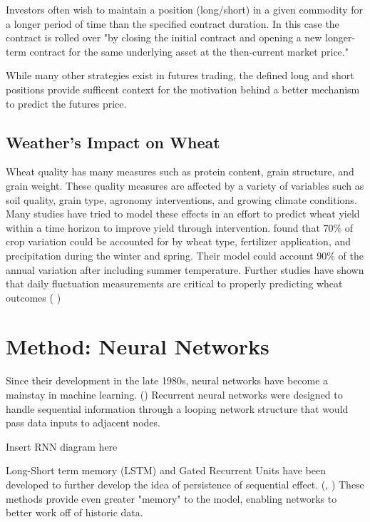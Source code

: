 \documentclass[twoside,11pt]{article}
\begin{document}
  Investors often wish to maintain a position (long/short) in a given commodity for a longer period of time than the specified contract duration. In this case the contract is rolled over "by closing the initial contract and opening a new longer-term contract for the same underlying asset at the then-current market price." \cite{InvestopediaRF}

  While many other strategies exist in futures trading, the defined long and short positions provide sufficent context for the motivation behind a better mechanism to predict the futures price.
 
\subsection{Weather's Impact on Wheat}
	
	Wheat quality has many measures such as protein content, grain structure, and grain weight. These quality measures are affected by a variety of variables such as soil quality, grain type, agronomy interventions, and growing climate conditions. Many studies have tried to model these effects in an effort to predict wheat yield within a time horizon to improve yield through intervention. \cite{Gooding2017} found that 70\% of crop variation could be accounted for by wheat type, fertilizer application, and precipitation during the winter and spring. Their model could account 90\% of the annual variation after including summer temperature. Further studies have shown that daily fluctuation measurements are critical to properly predicting wheat outcomes (\cite{Nuttall2017} \cite{Mearns1996})
	
\section{Method: Neural Networks} \label{model}

Since their development in the late 1980s, neural networks have become a mainstay in machine learning. (\cite{Schmidhuber2015}) Recurrent neural networks were designed to handle sequential information through a looping network structure that would pass data inputs to adjacent nodes. 

Insert RNN diagram here

Long-Short term memory (LSTM) and Gated Recurrent Units have been developed to further develop the idea of persistence of sequential effect. (\cite{Hochreiter1997}, \cite{Chung}) These methods provide even greater "memory" to the model, enabling networks to better work off of historic data. 
\end{document}
